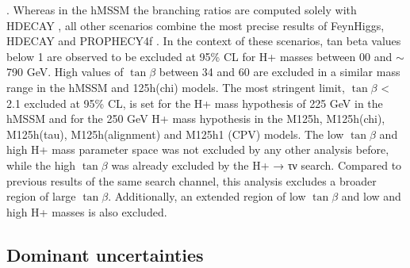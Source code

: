 . Whereas in the hMSSM the branching ratios are computed solely with HDECAY %
, all other scenarios combine the most
precise results of FeynHiggs, HDECAY and PROPHECY4f %
. In the context of these scenarios, tan beta values below 1 are observed to be excluded at 95\% CL for H+ masses between 00 and $\sim$790 GeV. High values of $\tan\beta$ between 34 and 60 are excluded in a similar mass range in the hMSSM and 125h(chi) models. The most stringent limit, $\tan\beta$ < 2.1 excluded at 95\% CL, is set for the H+ mass hypothesis of 225 GeV in the hMSSM and for the 250 GeV H+ mass hypothesis in the M125h, M125h(chi), M125h(tau), M125h(alignment) and M125h1 (CPV) models. The low $\tan\beta$ and high H+ mass parameter space was not excluded by any other analysis before, while the high $\tan\beta$ was already excluded by the H+ → τν search. Compared to previous results of the same search channel, this analysis excludes a broader region of large $\tan\beta$. Additionally, an extended region of low $\tan\beta$ and low and high H+ masses is also excluded.


\subsection{Dominant uncertainties}

